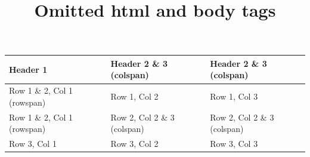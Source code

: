 \documentclass[11pt,a4paper]{article}
\title{Omitted html and body tags}
\begin{document}
\maketitle

\begin{table}[h]
\begin{tabular}{|l|l|l|}
\hline
Header 1 & Header 2 \& 3 (colspan) & Header 2 \& 3 (colspan) \\ \hline
Row 1 \& 2, Col 1 (rowspan) & Row 1, Col 2 & Row 1, Col 3 \\ \hline
Row 1 \& 2, Col 1 (rowspan) & Row 2, Col 2 \& 3 (colspan) & Row 2, Col 2 \& 3 (colspan) \\ \hline
Row 3, Col 1 & Row 3, Col 2 & Row 3, Col 3 \\ \hline
\end{tabular}
\end{table}
\end{document}
